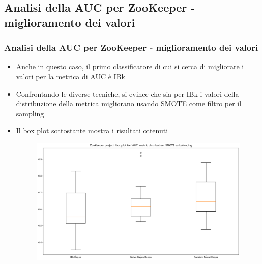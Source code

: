 \documentclass[10pt]{beamer}
\begin{document}
\begin{frame}
\subsection{Analisi della AUC per ZooKeeper - miglioramento dei valori}
\frametitle{Analisi della AUC per ZooKeeper - miglioramento dei valori}
\begin{itemize}
\item Anche in questo caso, il primo classificatore di cui si cerca di migliorare i valori per la metrica di AUC è IBk
\item Confrontando le diverse tecniche, si evince che sia per IBk  i valori della distribuzione della metrica migliorano usando SMOTE come filtro per il sampling
\item Il box plot sottostante mostra i risultati ottenuti
\begin{figure}
\includegraphics[scale=0.25]{images/auc_bett_zk}
\end{figure}
\end{itemize}
\end{frame}
\end{document}
